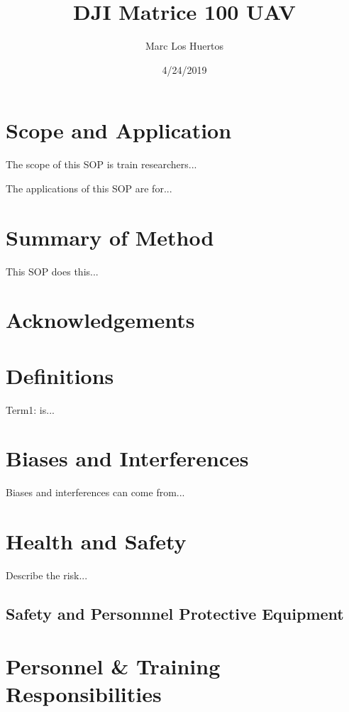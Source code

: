 \documentclass[12pt]{../SOP4_alpha}\usepackage[]{graphicx}\usepackage[]{color}
\title{DJI Matrice 100 UAV}
\date{4/24/2019}
\author{Marc Los Huertos}
\begin{document}
\maketitle

\section{Scope and Application}

\NP The scope of this SOP is train researchers...

\NP The applications of this SOP are for...

\section{Summary of Method}

\NP This SOP does this...

\tableofcontents

\newpage

\section{Acknowledgements}

\section{Definitions}

\NP Term1: is...

\section{Biases and Interferences}

\NP Biases and interferences can come from...

\section{Health and Safety}

\NP Describe the risk...


\subsection{Safety and Personnnel Protective Equipment}


\section{Personnel \& Training Responsibilities}
\end{document}
